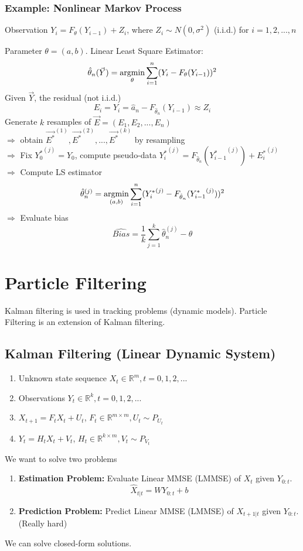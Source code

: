 \documentclass[11pt]{elegantbook}
\newcommand{\argmin}{\operatornamewithlimits{argmin}}
\begin{document}
\subsection*{Example: Nonlinear Markov Process}
Observation $Y_i=F_{\theta}(Y_{i-1})+Z_i$, where $Z_i\sim N(0,\sigma^2)$ (i.i.d.) for $i=1,2,...,n$

Parameter $\theta=(a,b)$. Linear Least Square Estimator:
$$\hat{\theta}_n(\vec{Y})=\argmin_{\theta}\sum_{i=1}^n(Y_i-F_{\theta}(Y_{i-1}))^2$$
Given $\vec{Y}$, the residual (not i.i.d.)$$E_i=Y_i=\hat{a}_n-F_{\hat{\theta}_n}(Y_{i-1})\approx Z_i$$
Generate $k$ resamples of $\vec{E}=(E_1,E_2,...,E_n)$\\
$\Rightarrow$ obtain $\vec{E^*}^{(1)},\vec{E^*}^{(2)},...,\vec{E^*}^{(k)}$ by resampling\\
$\Rightarrow$ Fix ${Y_0^*}^{(j)}=Y_0$, compute pseudo-data ${Y_i^*}^{(j)}=F_{\hat{\theta}_n}({Y^*_{i-1}}^{(j)})+{E_i^*}^{(j)}$\\
$\Rightarrow$ Compute LS estimator $$\hat{\theta}_n^{(j)}=\argmin_{(a,b)}\sum_{i=1}^n({Y_i^*}^{(j)}-F_{\hat{\theta}_n}({Y^*_{i-1}}^{(j)}))^2$$
$\Rightarrow$ Evaluate bias $$\widehat{Bias}=\frac{1}{k}\sum_{j=1}^k \hat{\theta}_n^{(j)}-\theta$$


\chapter{Particle Filtering}
Kalman filtering is used in tracking problems (dynamic models). Particle Filtering is an extension of Kalman filtering.
\section{Kalman Filtering (Linear Dynamic System)}
\begin{enumerate}
    \item Unknown state sequence $X_t\in \mathbb{R}^m,t=0,1,2,...$
    \item Observations $Y_t\in \mathbb{R}^k,t=0,1,2,...$
    \item $X_{t+1}=F_tX_t+U_t$, $F_t\in \mathbb{R}^{m\times m}, U_t\sim P_{U_t}$
    \item $Y_t=H_tX_t+V_t$, $H_t\in \mathbb{R}^{k\times m}, V_t\sim P_{V_t}$
\end{enumerate}

We want to solve two problems
\begin{enumerate}
    \item \textbf{Estimation Problem:} Evaluate Linear MMSE (LMMSE) of $X_t$ given $Y_{0:t}$. $$\hat{X}_{t|t}=WY_{0:t}+b$$
    \item \textbf{Prediction Problem:} Predict Linear MMSE (LMMSE) of $X_{t+1|t}$ given $Y_{0:t}$. (Really hard)
\end{enumerate}
We can solve closed-form solutions.
\end{document}
